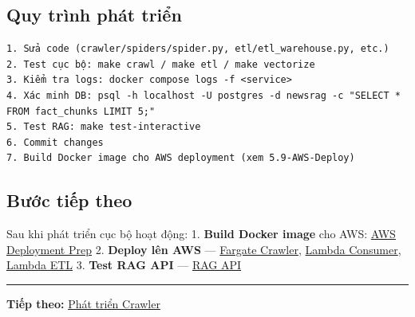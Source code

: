 \hypertarget{quy-truxecnh-phuxe1t-triux1ec3n}{%
\subsection{Quy trình phát
triển}}

\begin{verbatim}
1. Sửa code (crawler/spiders/spider.py, etl/etl_warehouse.py, etc.)
2. Test cục bộ: make crawl / make etl / make vectorize
3. Kiểm tra logs: docker compose logs -f <service>
4. Xác minh DB: psql -h localhost -U postgres -d newsrag -c "SELECT * FROM fact_chunks LIMIT 5;"
5. Test RAG: make test-interactive
6. Commit changes
7. Build Docker image cho AWS deployment (xem 5.9-AWS-Deploy)
\end{verbatim}

\hypertarget{bux1b0ux1edbc-tiux1ebfp-theo}{%
\subsection{Bước tiếp theo}}

Sau khi phát triển cục bộ hoạt động: 1. \textbf{Build Docker image} cho
AWS: \href{5.9-AWS-Deploy/}{AWS Deployment Prep} 2. \textbf{Deploy lên
AWS} --- \href{5.10-Fargate-Crawler/}{Fargate Crawler},
\href{5.11-Lambda-Consumer/}{Lambda Consumer},
\href{5.12-Lambda-ETL/}{Lambda ETL} 3. \textbf{Test RAG API} ---
\href{5.13-RAG-API/}{RAG API}

\begin{center}\rule{0.5\linewidth}{0.5pt}\end{center}

\textbf{Tiếp theo:} \href{5.5-Crawler/}{Phát triển Crawler}
